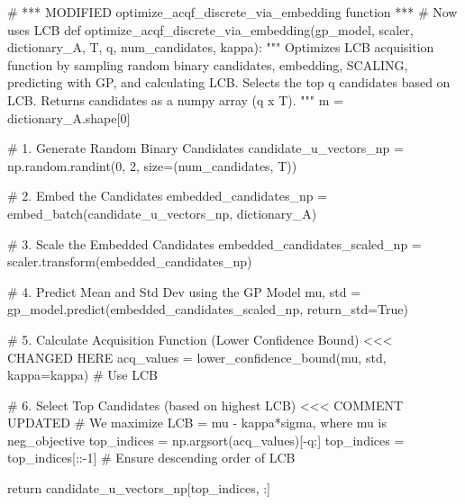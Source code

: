 \documentclass[
  letterpaper,
  DIV=11,
  numbers=noendperiod]{scrartcl}
\newenvironment{Shaded}{\begin{snugshade}}{\end{snugshade}}
\newcommand{\CommentTok}[1]{\textcolor[rgb]{0.37,0.37,0.37}{#1}}
\newcommand{\ControlFlowTok}[1]{\textcolor[rgb]{0.00,0.23,0.31}{#1}}
\newcommand{\DecValTok}[1]{\textcolor[rgb]{0.68,0.00,0.00}{#1}}
\newcommand{\KeywordTok}[1]{\textcolor[rgb]{0.00,0.23,0.31}{#1}}
\newcommand{\NormalTok}[1]{\textcolor[rgb]{0.00,0.23,0.31}{#1}}
\newcommand{\OperatorTok}[1]{\textcolor[rgb]{0.37,0.37,0.37}{#1}}
\newcommand{\VariableTok}[1]{\textcolor[rgb]{0.07,0.07,0.07}{#1}}
\begin{document}
\begin{Shaded}
\begin{Highlighting}[]
\CommentTok{\# *** MODIFIED optimize\_acqf\_discrete\_via\_embedding function ***}
\CommentTok{\# Now uses LCB}
\KeywordTok{def}\NormalTok{ optimize\_acqf\_discrete\_via\_embedding(gp\_model, scaler, dictionary\_A, T, q, num\_candidates, kappa):}
    \CommentTok{"""}
\CommentTok{    Optimizes LCB acquisition function by sampling random binary candidates,}
\CommentTok{    embedding, SCALING, predicting with GP, and calculating LCB.}
\CommentTok{    Selects the top q candidates based on LCB.}
\CommentTok{    Returns candidates as a numpy array (q x T).}
\CommentTok{    """}
\NormalTok{    m }\OperatorTok{=}\NormalTok{ dictionary\_A.shape[}\DecValTok{0}\NormalTok{]}

    \CommentTok{\# 1. Generate Random Binary Candidates}
\NormalTok{    candidate\_u\_vectors\_np }\OperatorTok{=}\NormalTok{ np.random.randint(}\DecValTok{0}\NormalTok{, }\DecValTok{2}\NormalTok{, size}\OperatorTok{=}\NormalTok{(num\_candidates, T))}

    \CommentTok{\# 2. Embed the Candidates}
\NormalTok{    embedded\_candidates\_np }\OperatorTok{=}\NormalTok{ embed\_batch(candidate\_u\_vectors\_np, dictionary\_A)}

    \CommentTok{\# 3. Scale the Embedded Candidates}
\NormalTok{    embedded\_candidates\_scaled\_np }\OperatorTok{=}\NormalTok{ scaler.transform(embedded\_candidates\_np)}

    \CommentTok{\# 4. Predict Mean and Std Dev using the GP Model}
\NormalTok{    mu, std }\OperatorTok{=}\NormalTok{ gp\_model.predict(embedded\_candidates\_scaled\_np, return\_std}\OperatorTok{=}\VariableTok{True}\NormalTok{)}

    \CommentTok{\# 5. Calculate Acquisition Function (Lower Confidence Bound) \textless{}\textless{}\textless{} CHANGED HERE}
\NormalTok{    acq\_values }\OperatorTok{=}\NormalTok{ lower\_confidence\_bound(mu, std, kappa}\OperatorTok{=}\NormalTok{kappa) }\CommentTok{\# Use LCB}

    \CommentTok{\# 6. Select Top Candidates (based on highest LCB) \textless{}\textless{}\textless{} COMMENT UPDATED}
    \CommentTok{\# We maximize LCB = mu {-} kappa*sigma, where mu is neg\_objective}
\NormalTok{    top\_indices }\OperatorTok{=}\NormalTok{ np.argsort(acq\_values)[}\OperatorTok{{-}}\NormalTok{q:]}
\NormalTok{    top\_indices }\OperatorTok{=}\NormalTok{ top\_indices[::}\OperatorTok{{-}}\DecValTok{1}\NormalTok{] }\CommentTok{\# Ensure descending order of LCB}

    \ControlFlowTok{return}\NormalTok{ candidate\_u\_vectors\_np[top\_indices, :]}



\end{Highlighting}
\end{Shaded}
\end{document}
